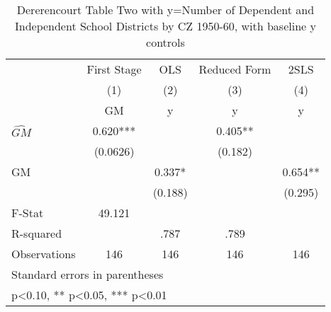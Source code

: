 \begin{table}[htbp]\centering
\def\sym#1{\ifmmode^{#1}\else\(^{#1}\)\fi}
\caption{Dererencourt Table Two with y=Number of Dependent and Independent School Districts by CZ 1950-60, with baseline y controls}
\begin{tabular}{l*{4}{c}}
\toprule
                    & First Stage   &         OLS   &Reduced Form   &        2SLS   \\
                    &\multicolumn{1}{c}{(1)}&\multicolumn{1}{c}{(2)}&\multicolumn{1}{c}{(3)}&\multicolumn{1}{c}{(4)}\\
                    &\multicolumn{1}{c}{GM}&\multicolumn{1}{c}{y}&\multicolumn{1}{c}{y}&\multicolumn{1}{c}{y}\\
\midrule
$\hat{GM}$          &       0.620***&               &       0.405** &               \\
                    &    (0.0626)   &               &     (0.182)   &               \\
\addlinespace
GM                  &               &       0.337*  &               &       0.654** \\
                    &               &     (0.188)   &               &     (0.295)   \\
\midrule
F-Stat              &      49.121   &               &               &               \\
R-squared           &               &        .787   &        .789   &               \\
Observations        &         146   &         146   &         146   &         146   \\
\bottomrule
\multicolumn{5}{l}{\footnotesize Standard errors in parentheses}\\
\multicolumn{5}{l}{\footnotesize * p<0.10, ** p<0.05, *** p<0.01}\\
\end{tabular}
\end{table}
